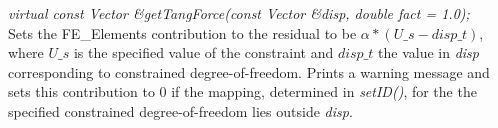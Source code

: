 {\em virtual const Vector \&getTangForce(const Vector \&disp, double
fact = 1.0);    }\\
Sets the FE\_Elements contribution to the residual to be
$\alpha * (U\_s - disp\_t)$, where $U\_s$ is the specified value of the
constraint and $disp\_t$ the value in {\em disp}
corresponding to constrained degree-of-freedom. Prints a warning
message and sets this contribution to $0$ if the mapping, determined in
{\em setID()}, for the the specified constrained degree-of-freedom lies 
outside {\em disp}. \\  










